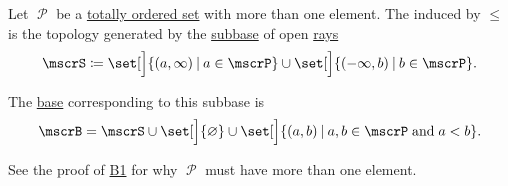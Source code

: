 \begin{definition}\label{def:order_topology}
  Let \( \mscrP \) be a \hyperref[def:partially_ordered_set]{totally ordered set} with more than one element. The  induced by \( \leq \) is the topology generated by the \hyperref[def:topological_subbase]{subbase} of open \hyperref[def:partially_ordered_set_interval/ray]{rays}
  \begin{equation*}
    \mscrS \coloneqq \set[\Big]{ (a, \infty) \given a \in \mscrP } \cup \set[\Big]{ (-\infty, b) \given b \in \mscrP }.
  \end{equation*}

  The \hyperref[def:topological_base]{base} corresponding to this subbase is
  \begin{equation*}
    \mscrB = \mscrS \cup \set[\Big]{ \varnothing } \cup \set[\Big]{ (a, b) \given a, b \in \mscrP \T{and} a < b }.
  \end{equation*}

  See the proof of \hyperref[thm:topological_base_axioms/B1]{B1} for why \( \mscrP \) must have more than one element.
\end{definition}
